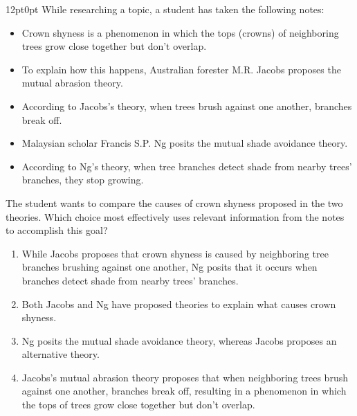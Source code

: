 \documentclass[11pt, twocolumn]{article}
\newcounter{questionnum}
\begin{document}
\vspace{6pt}\noindent
\begin{minipage}{\columnwidth}\raggedright
\noindent{}\par\vspace{8pt}
\begin{adjustwidth}{12pt}{0pt}
While researching a topic, a student has taken the following notes:

\begin{itemize}

\item Crown shyness is a phenomenon in which the tops (crowns) of neighboring trees grow close together but don't overlap.

\item To explain how this happens, Australian forester M.R. Jacobs proposes the mutual abrasion theory.

\item According to Jacobs's theory, when trees brush against one another, branches break off.

\item Malaysian scholar Francis S.P. Ng posits the mutual shade avoidance theory.

\item According to Ng's theory, when tree branches detect shade from nearby trees' branches, they stop growing.

\end{itemize}
\vspace{6pt}

The student wants to compare the causes of crown shyness proposed in the two theories. Which choice most effectively uses relevant information from the notes to accomplish this goal?
\begin{enumerate}[label=\Alph*),leftmargin=18pt,topsep=3pt,itemsep=2pt]
  \item While Jacobs proposes that crown shyness is caused by neighboring tree branches brushing against one another, Ng posits that it occurs when branches detect shade from nearby trees' branches.
  \item Both Jacobs and Ng have proposed theories to explain what causes crown shyness.
  \item Ng posits the mutual shade avoidance theory, whereas Jacobs proposes an alternative theory.
  \item Jacobs's mutual abrasion theory proposes that when neighboring trees brush against one another, branches break off, resulting in a phenomenon in which the tops of trees grow close together but don't overlap.
\end{enumerate}
\end{adjustwidth}
\end{minipage}\par
\end{document}
